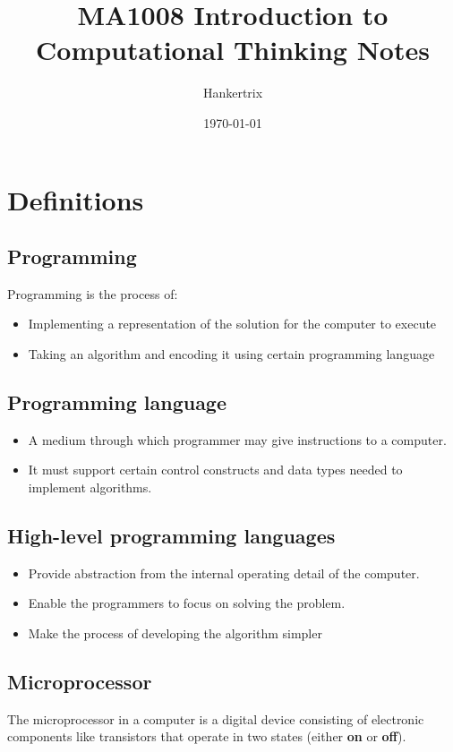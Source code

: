 \documentclass[11pt]{article}
\author{Hankertrix}
\date{\today}
\title{MA1008 Introduction to Computational Thinking Notes}
\begin{document}
\maketitle
\setcounter{tocdepth}{2}
\tableofcontents \clearpage\section{Definitions}
\label{sec:orgc915baa}

\subsection{Programming}
\label{sec:org26b698a}
Programming is the process of:
\begin{itemize}
\item Implementing a representation of the solution for the computer to execute
\item Taking an algorithm and encoding it using certain programming language
\end{itemize}
\subsection{Programming language}
\label{sec:org69eb102}
\begin{itemize}
\item A medium through which programmer may give instructions to a computer.
\item It must support certain control constructs and data types needed to implement algorithms.
\end{itemize}
\subsection{High-level programming languages}
\label{sec:org21e537f}
\begin{itemize}
\item Provide abstraction from the internal operating detail of the computer.
\item Enable the programmers to focus on solving the problem.
\item Make the process of developing the algorithm simpler
\end{itemize}
\subsection{Microprocessor}
\label{sec:org3958346}
The microprocessor in a computer is a digital device consisting of electronic components like transistors that operate in two states (either \textbf{on} or \textbf{off}).
\end{document}
